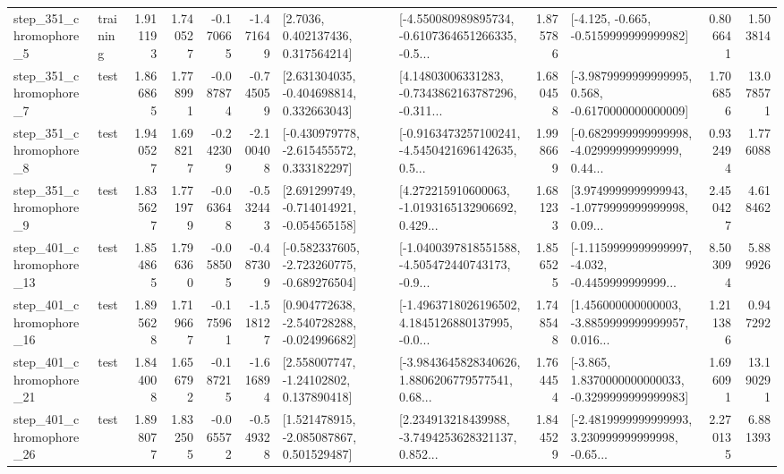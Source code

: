 \begin{tabular}{llrrrrllrlrr}
   step\_351\_chromophore\_5 &  training &      1.911193 &    1.740527 &     -0.170665 & -1.471649 &          [2.7036, 0.402137436, 0.317564214] &  [-4.550080989895734, -0.6107364651266335, -0.5... &       1.875786 &              [-4.125, -0.665, -0.5159999999999982] &            0.806641 &          1.503814 \\
   step\_351\_chromophore\_7 &      test &      1.866865 &    1.778991 &     -0.087874 & -0.745059 &    [2.631304035, -0.404698814, 0.332663043] &  [4.14803006331283, -0.7343862163787296, -0.311... &       1.680458 &  [-3.9879999999999995, 0.568, -0.6170000000000009] &            1.706856 &         13.078571 \\
   step\_351\_chromophore\_8 &      test &      1.940527 &    1.698217 &     -0.242309 & -2.100408 &   [-0.430979778, -2.615455572, 0.333182297] &  [-0.9163473257100241, -4.5450421696142635, 0.5... &       1.998669 &  [-0.6829999999999998, -4.029999999999999, 0.44... &            0.932494 &          1.776088 \\
   step\_351\_chromophore\_9 &      test &      1.835627 &    1.771979 &     -0.063648 & -0.532443 &   [2.691299749, -0.714014921, -0.054565158] &  [4.272215910600063, -1.0193165132906692, 0.429... &       1.681233 &  [3.9749999999999943, -1.0779999999999998, 0.09... &            2.450427 &          4.618462 \\
  step\_401\_chromophore\_13 &      test &      1.854865 &    1.796360 &     -0.058505 & -0.487309 &  [-0.582337605, -2.723260775, -0.689276504] &  [-1.0400397818551588, -4.505472440743173, -0.9... &       1.856525 &  [-1.1159999999999997, -4.032, -0.4459999999999... &            8.503094 &          5.889926 \\
  step\_401\_chromophore\_16 &      test &      1.895628 &    1.719667 &     -0.175961 & -1.518127 &   [0.904772638, -2.540728288, -0.024996682] &  [-1.4963718026196502, 4.1845126880137995, -0.0... &       1.748548 &  [1.456000000000003, -3.8859999999999957, 0.016... &            1.211386 &          0.947292 \\
  step\_401\_chromophore\_21 &      test &      1.844008 &    1.656792 &     -0.187215 & -1.616894 &     [2.558007747, -1.24102802, 0.137890418] &  [-3.9843645828340626, 1.8806206779577541, 0.68... &       1.764454 &  [-3.865, 1.8370000000000033, -0.3299999999999983] &            1.696091 &         13.190291 \\
  step\_401\_chromophore\_26 &      test &      1.898077 &    1.832505 &     -0.065572 & -0.549328 &    [1.521478915, -2.085087867, 0.501529487] &  [2.234913218439988, -3.7494253628321137, 0.852... &       1.844529 &  [-2.4819999999999993, 3.230999999999998, -0.65... &            2.270135 &          6.881393 \\

\end{tabular}
